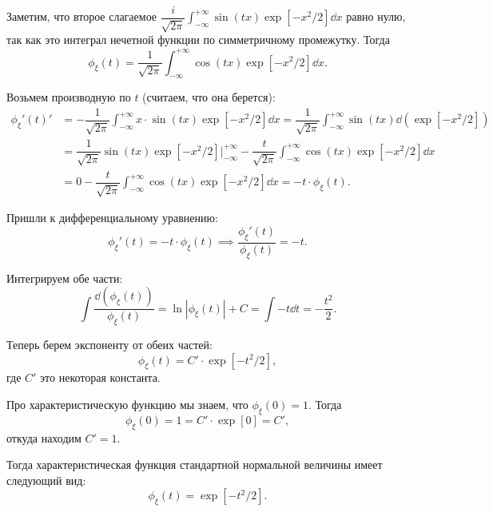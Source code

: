 Заметим, что второе слагаемое $\dfrac{i}{\sqrt{2 \pi}} \int_{-\infty}^{+\infty} \sin (tx) \exp[-x^2/2] \dd x$ равно нулю, так как это интеграл нечетной функции по симметричному промежутку. Тогда
\begin{equation*}
    \phi_{\xi}(t) 
    = \dfrac{1}{\sqrt{2 \pi}} \int_{-\infty}^{+\infty} \cos (tx) \exp[-x^2/2] \dd x.
\end{equation*}

Возьмем производную по $t$ (считаем, что она берется):
\begin{align*}
    \phi_{\xi}'(t)'
    &= -\dfrac{1}{\sqrt{2 \pi}} \int_{-\infty}^{+\infty} x \cdot \sin (tx) \exp[-x^2/2] \dd x
    = \dfrac{1}{\sqrt{2 \pi}} \int_{-\infty}^{+\infty} \sin (tx) \dd (\exp[-x^2/2]) \\
    &= \dfrac{1}{\sqrt{2 \pi}} \sin (tx) \exp[-x^2/2]\Big|_{-\infty}^{+\infty} - \dfrac{t}{\sqrt{2\pi}} \int_{-\infty}^{+\infty} \cos (tx) \exp[-x^2/2] \dd x \\
    &= 0 - \dfrac{t}{\sqrt{2\pi}} \int_{-\infty}^{+\infty} \cos (tx) \exp[-x^2/2] \dd x
    = -t \cdot \phi_{\xi}(t).
\end{align*}

Пришли к дифференциальному уравнению:
\begin{equation*}
    \phi_{\xi}'(t) = -t \cdot \phi_{\xi}(t) \implies
    \dfrac{\phi_{\xi}'(t)}{\phi_{\xi}(t)} = -t.
\end{equation*}

Интегрируем обе части:
\begin{equation*}
    \int \dfrac{\dd (\phi_{\xi}(t))}{\phi_{\xi}(t)} = \ln |\phi_{\xi}(t)| + C = \int -t \dd t = - \dfrac{t^2}{2}.
\end{equation*}

Теперь берем экспоненту от обеих частей:
\begin{equation*}
    \phi_{\xi}(t) = C' \cdot \exp[-t^2/2],
\end{equation*}
где $C'$ это некоторая константа. 

Про характеристическую функцию мы знаем, что $\phi_{\xi}(0) = 1$. Тогда
\begin{equation*}
    \phi_{\xi}(0) = 1 = C' \cdot \exp[0] = C',
\end{equation*}
откуда находим $C' = 1$.

Тогда характеристическая функция стандартной нормальной величины имеет следующий вид:
\begin{equation*}
    \phi_{\xi}(t) = \exp[-t^2/2].
\end{equation*}

